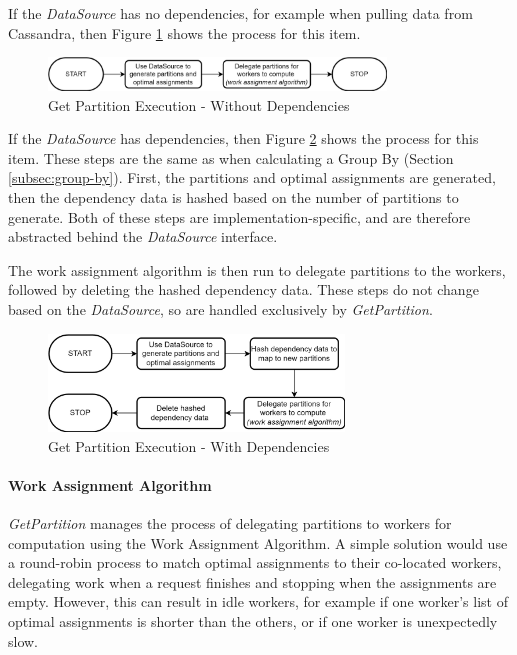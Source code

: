 If the \textit{DataSource} has no dependencies, for example when pulling data from Cassandra, then Figure \ref{fig:get-partition-no-dependencies} shows the process for this item. 

\begin{figure}[h]
	\centering
	\includegraphics[width=0.8\textwidth]{chapters/diagrams/implementation/get-partition-no-dependencies-flow}
	\caption{Get Partition Execution - Without Dependencies}
	\label{fig:get-partition-no-dependencies}
\end{figure}

\pagebreak
If the \textit{DataSource} has dependencies, then Figure \ref{fig:get-partition-dependencies} shows the process for this item. These steps are the same as when calculating a Group By (Section \ref{subsec:group-by}). First, the partitions and optimal assignments are generated, then the dependency data is hashed based on the number of partitions to generate. Both of these steps are implementation-specific, and are therefore abstracted behind the \textit{DataSource} interface. 

The work assignment algorithm is then run to delegate partitions to the workers, followed by deleting the hashed dependency data. These steps do not change based on the \textit{DataSource}, so are handled exclusively by \textit{GetPartition}.
\begin{figure}[h]
	\centering
	\includegraphics[width=0.7\textwidth]{chapters/diagrams/implementation/get-partition-dependencies-flow}
	\caption{Get Partition Execution - With Dependencies}
	\label{fig:get-partition-dependencies}
\end{figure}

\paragraph{Work Assignment Algorithm} %
\textit{GetPartition} manages the process of delegating partitions to workers for computation using the Work Assignment Algorithm. A simple solution would use a round-robin process to match optimal assignments to their co-located workers, delegating work when a request finishes and stopping when the assignments are empty. However, this can result in idle workers, for example if one worker's list of optimal assignments is shorter than the others, or if one worker is unexpectedly slow.

